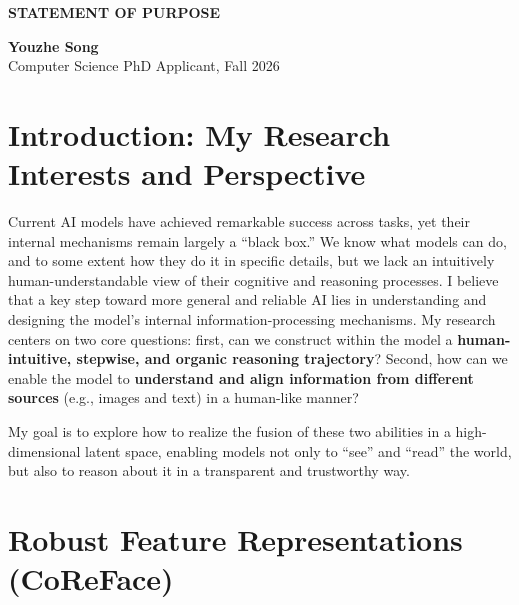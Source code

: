 \documentclass[11pt, letterpaper]{article}
\begin{document}
\noindent %
\begin{minipage}[t]{0.6\textwidth} %
    \raggedright
    \textbf{STATEMENT OF PURPOSE} \\
\end{minipage}%
\begin{minipage}[t]{0.4\textwidth} %
    \raggedleft
    \textbf{Youzhe Song} \\ %
    Computer Science PhD Applicant, Fall 2026 %
\end{minipage}

\vspace{2.5em} %

\section{Introduction: My Research Interests and Perspective}

Current AI models have achieved remarkable success across tasks, yet their internal mechanisms remain largely a “black box.” We know what models can do, and to some extent how they do it in specific details, but we lack an intuitively human-understandable view of their cognitive and reasoning processes. I believe that a key step toward more general and reliable AI lies in understanding and designing the model’s internal information-processing mechanisms. My research centers on two core questions: first, can we construct within the model a \textbf{human-intuitive, stepwise, and organic reasoning trajectory}? Second, how can we enable the model to \textbf{understand and align information from different sources} (e.g., images and text) in a human-like manner?

My goal is to explore how to realize the fusion of these two abilities in a high-dimensional latent space, enabling models not only to “see” and “read” the world, but also to reason about it in a transparent and trustworthy way.

\section{Robust Feature Representations (CoReFace)}
\end{document}
